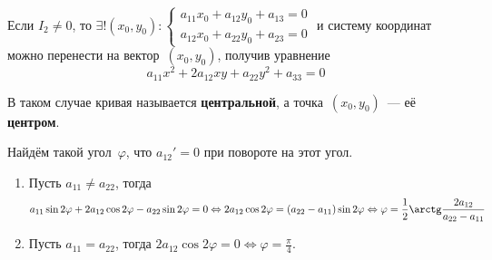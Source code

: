 Если $I_2 \neq 0$, то $\exists! (x_0, y_0) \colon
\begin{cases}
a_{11} x_0 + a_{12} y_0 + a_{13} = 0 \\
a_{12} x_0 + a_{22} y_0 + a_{23} = 0
\end{cases}$ и систему координат можно перенести на вектор~$(x_0, y_0)$, получив уравнение
\begin{equation*}
a_{11} x^2 + 2 a_{12} xy + a_{22} y^2 + a_{33} = 0
\end{equation*}

В таком случае кривая называется \textbf{центральной}, а точка~$(x_0, y_0)$~--- её \textbf{центром}.

Найдём такой угол~$\varphi$, что $a_{12}' = 0$ при повороте на этот угол.
\begin{enumerate}
	\item Пусть $a_{11} \neq a_{22}$, тогда
	\begin{equation*}
	a_{11} \sin 2\varphi + 2 a_{12} \cos 2\varphi - a_{22} \sin 2\varphi = 0 \Leftrightarrow
	2 a_{12} \cos 2\varphi = (a_{22} - a_{11}) \sin 2\varphi \Leftrightarrow
	\varphi = \frac12 \arctg \frac{2 a_{12}}{a_{22} - a_{11}}
	\end{equation*}
	
	\item Пусть $a_{11} = a_{22}$, тогда $2 a_{12} \cos 2\varphi = 0 \Leftrightarrow
	\varphi = \frac\pi4$.
\end{enumerate}
                                                              
